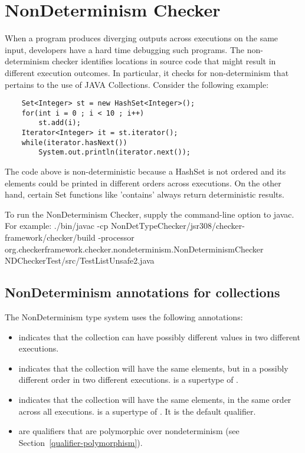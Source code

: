 \htmlhr
\chapter{NonDeterminism Checker\label{nondeterminism-checker}}
When a program produces diverging outputs across executions on the same input, developers
have a hard time debugging such programs. 
The non-determinism checker identifies locations in source code that might result in different execution outcomes. 
In particular, it checks for non-determinism that pertains to the use of JAVA Collections.
Consider the following example:
\begin{Verbatim}
	Set<Integer> st = new HashSet<Integer>(); 
	for(int i = 0 ; i < 10 ; i++)
		st.add(i);
	Iterator<Integer> it = st.iterator();
	while(iterator.hasNext())
		System.out.println(iterator.next());

\end{Verbatim}

The code above is non-deterministic because a HashSet is not ordered and its elements could be printed in different orders across executions.
On the other hand, certain Set functions like 'contains' always return deterministic results.

To run the NonDeterminism Checker, supply the
command-line option to javac.
For example: ./bin/javac -cp NonDetTypeChecker/jsr308/checker-framework/checker/build -processor org.checkerframework.checker.nondeterminism.NonDeterminismChecker NDCheckerTest/src/TestListUnsafe2.java

\section{NonDeterminism annotations for collections\label{nondeterminism-annotations-collections}}

The NonDeterminism type system uses the following annotations:
\begin{itemize}
\item
   indicates
  that the collection can have possibly different values in two different executions.
\item
   indicates that
  the collection will have the same elements, but in a possibly different order in two different executions.
   is a supertype of .
 \item
   indicates that
  the collection will have the same elements, in the same order across all executions.
   is a supertype of .
   It is the default qualifier.
\item
   are qualifiers that are
  polymorphic over nondeterminism (see Section~\ref{qualifier-polymorphism}).
\end{itemize}

